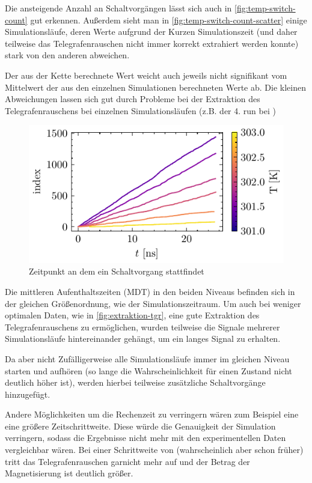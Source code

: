 \documentclass[main.tex]{subfiles}
\begin{document}
Die ansteigende Anzahl an Schaltvorgängen lässt sich auch in \cref{fig:temp-switch-count} gut erkennen. Außerdem sieht man in \cref{fig:temp-switch-count-scatter} einige Simulationsläufe, deren Werte aufgrund der Kurzen Simulationszeit (und daher teilweise das Telegrafenrauschen nicht immer korrekt extrahiert werden konnte) stark von den anderen abweichen.

Der aus der Kette berechnete Wert weicht auch jeweils nicht signifikant vom Mittelwert der aus den einzelnen Simulationen berechneten Werte ab.
Die kleinen Abweichungen lassen sich gut durch Probleme bei der Extraktion des Telegrafenrauschens bei einzelnen Simulationsläufen (z.B. der 4. run bei ) 


\begin{figure}[H]
    \centering
    \includegraphics{bilder/plots/temp_comparison/switch_events.pdf}
    \caption{Zeitpunkt an dem ein Schaltvorgang stattfindet }\label{fig:switch-events}
\end{figure}

Die mittleren Aufenthaltszeiten (MDT) in den beiden Niveaus befinden sich in der gleichen Größenordnung, wie der Simulationszeitraum. Um auch bei weniger optimalen Daten, wie in \cref{fig:extraktion-tgr}, eine gute Extraktion des Telegrafenrauschens zu ermöglichen, wurden teilweise die Signale mehrerer Simulationsläufe hintereinander gehängt, um ein langes Signal zu erhalten.

Da aber nicht Zufälligerweise alle Simulationsläufe immer im gleichen Niveau starten und aufhören (so lange die Wahrscheinlichkeit für einen Zustand nicht deutlich höher ist), werden hierbei teilweise zusätzliche Schaltvorgänge hinzugefügt. 

Andere Möglichkeiten um die Rechenzeit zu verringern wären zum Beispiel eine eine größere Zeitschrittweite. Diese würde die Genauigkeit der Simulation verringern, sodass die Ergebnisse nicht mehr mit den experimentellen Daten vergleichbar wären. Bei einer Schrittweite von  (wahrscheinlich aber schon früher) tritt das Telegrafenrauschen garnicht mehr auf und der Betrag der Magnetisierung ist deutlich größer.
\end{document}
